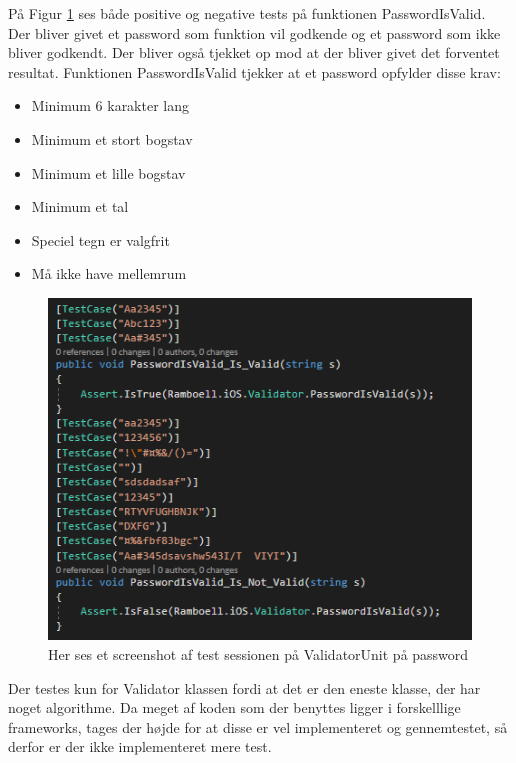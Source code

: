 På Figur \ref{fig:ValidatorUnitPassword} ses både positive og negative tests på funktionen PasswordIsValid. Der bliver givet et password som funktion vil godkende og et password som ikke bliver godkendt. Der bliver også tjekket op mod at der bliver givet det forventet resultat. Funktionen PasswordIsValid tjekker at et password opfylder disse krav: \\
\begin{itemize}
	\item Minimum 6 karakter lang
	\item Minimum et stort bogstav
	\item Minimum et lille bogstav
	\item Minimum et tal
	\item Speciel tegn er valgfrit
	\item Må ikke have mellemrum
\end{itemize}

\begin{figure}[H]
	\centering
	\includegraphics[width=0.6\linewidth]{Unit/ValidatorUnitPassword.PNG}
	\caption{Her ses et screenshot af test sessionen på ValidatorUnit på password}
	\label{fig:ValidatorUnitPassword}
\end{figure}

Der testes kun for Validator klassen fordi at det er den eneste klasse, der har noget algorithme. Da meget af koden som der benyttes ligger i forskelllige frameworks, tages der højde for at disse er vel implementeret og gennemtestet, så derfor er der ikke implementeret mere test. 

